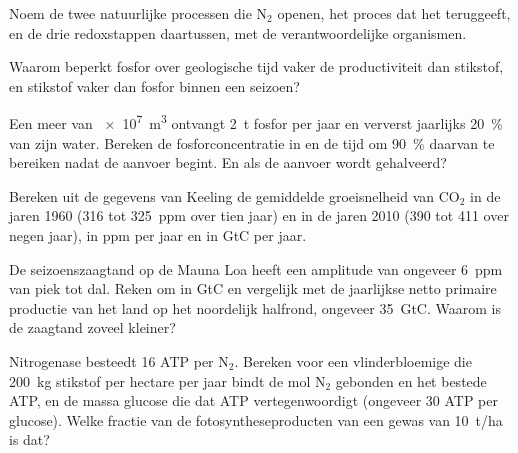 \begin{exercise}[$\star$]\label{exo:b2:biogeochemical-cycles:3}
Noem de twee natuurlijke processen die $\mathrm{N_2}$ openen, het proces dat
het teruggeeft, en de drie redoxstappen daartussen, met de
verantwoordelijke organismen.
\end{exercise}

\begin{exercise}[$\star$]\label{exo:b2:biogeochemical-cycles:4}
Waarom beperkt fosfor over geologische tijd vaker de productiviteit dan
stikstof, en stikstof vaker dan fosfor binnen een
seizoen?
\end{exercise}

\begin{exercise}[$\star\star$]\label{exo:b2:biogeochemical-cycles:5}
Een meer van \qty{e7}{m^3} ontvangt \qty{2}{t} fosfor per jaar
en ververst jaarlijks \qty{20}{\%} van zijn water. Bereken de
fosforconcentratie in  en de tijd om \qty{90}{\%}
daarvan te bereiken nadat de aanvoer begint. En als de aanvoer wordt gehalveerd?
\end{exercise}

\begin{exercise}[$\star\star$]\label{exo:b2:biogeochemical-cycles:6}
Bereken uit de gegevens van Keeling de gemiddelde groeisnelheid van $\mathrm{CO_2}$ in
de jaren 1960 (316 tot \qty{325}{ppm} over tien jaar) en in de jaren 2010
(390 tot 411 over negen jaar), in ppm per jaar en in GtC per jaar.
\end{exercise}

\begin{exercise}[$\star\star$]\label{exo:b2:biogeochemical-cycles:7}
De seizoenszaagtand op de Mauna Loa heeft een amplitude van ongeveer
\qty{6}{ppm} van piek tot dal. Reken om in GtC en vergelijk met de
jaarlijkse netto primaire productie van het land op het noordelijk halfrond,
ongeveer \qty{35}{GtC}. Waarom is de zaagtand zoveel kleiner?
\end{exercise}

\begin{exercise}[$\star\star$]\label{exo:b2:biogeochemical-cycles:8}
Nitrogenase besteedt 16 ATP per $\mathrm{N_2}$. Bereken voor een vlinderbloemige
die \qty{200}{kg} stikstof per hectare per jaar bindt de mol
$\mathrm{N_2}$ gebonden en het bestede ATP, en de massa glucose die dat ATP
vertegenwoordigt (ongeveer 30 ATP per glucose). Welke fractie van de
fotosyntheseproducten van een gewas van \qty{10}{t/ha} is dat?
\end{exercise}


